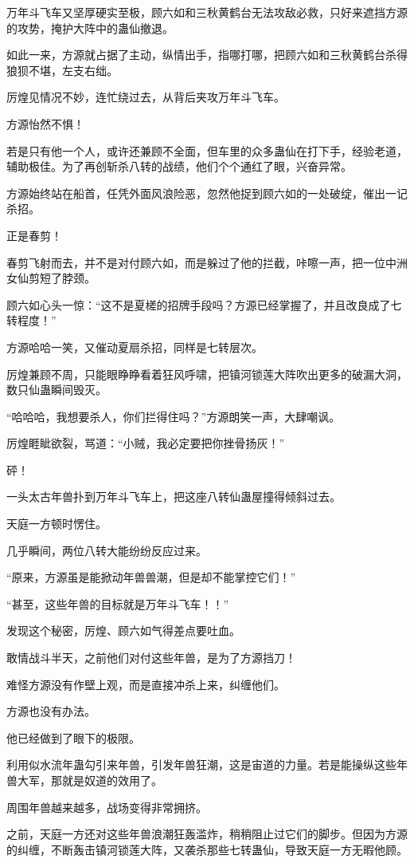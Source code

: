 \begin{this_body}
万年斗飞车又坚厚硬实至极，顾六如和三秋黄鹤台无法攻敌必救，只好来遮挡方源的攻势，掩护大阵中的蛊仙撤退。

如此一来，方源就占据了主动，纵情出手，指哪打哪，把顾六如和三秋黄鹤台杀得狼狈不堪，左支右绌。

厉煌见情况不妙，连忙绕过去，从背后夹攻万年斗飞车。

方源怡然不惧！

若是只有他一个人，或许还兼顾不全面，但车里的众多蛊仙在打下手，经验老道，辅助极佳。为了再创斩杀八转的战绩，他们个个通红了眼，兴奋异常。

方源始终站在船首，任凭外面风浪险恶，忽然他捉到顾六如的一处破绽，催出一记杀招。

正是春剪！

春剪飞射而去，并不是对付顾六如，而是躲过了他的拦截，咔嚓一声，把一位中洲女仙剪短了脖颈。

顾六如心头一惊：“这不是夏槎的招牌手段吗？方源已经掌握了，并且改良成了七转程度！”

方源哈哈一笑，又催动夏扇杀招，同样是七转层次。

厉煌兼顾不周，只能眼睁睁看着狂风呼啸，把镇河锁莲大阵吹出更多的破漏大洞，数只仙蛊瞬间毁灭。

“哈哈哈，我想要杀人，你们拦得住吗？”方源朗笑一声，大肆嘲讽。

厉煌睚眦欲裂，骂道：“小贼，我必定要把你挫骨扬灰！”

砰！

一头太古年兽扑到万年斗飞车上，把这座八转仙蛊屋撞得倾斜过去。

天庭一方顿时愣住。

几乎瞬间，两位八转大能纷纷反应过来。

“原来，方源虽是能掀动年兽兽潮，但是却不能掌控它们！”

“甚至，这些年兽的目标就是万年斗飞车！！”

发现这个秘密，厉煌、顾六如气得差点要吐血。

敢情战斗半天，之前他们对付这些年兽，是为了方源挡刀！

难怪方源没有作壁上观，而是直接冲杀上来，纠缠他们。

方源也没有办法。

他已经做到了眼下的极限。

利用似水流年蛊勾引来年兽，引发年兽狂潮，这是宙道的力量。若是能操纵这些年兽大军，那就是奴道的效用了。

周围年兽越来越多，战场变得非常拥挤。

之前，天庭一方还对这些年兽浪潮狂轰滥炸，稍稍阻止过它们的脚步。但因为方源的纠缠，不断轰击镇河锁莲大阵，又袭杀那些七转蛊仙，导致天庭一方无暇他顾。


\end{this_body}
